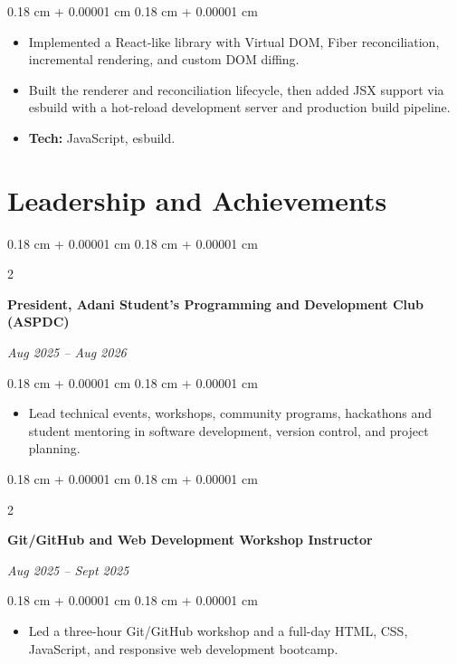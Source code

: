 \documentclass[10pt, letterpaper]{article}
\newenvironment{highlights}{
    \begin{itemize}[
        topsep=0.09 cm,
        parsep=0.09 cm,
        partopsep=0pt,
        itemsep=0pt,
        leftmargin=0.4 cm + 10pt
    ]
}{
    \end{itemize}
} %
\newenvironment{onecolentry}{
    \begin{adjustwidth}{
        0.18 cm + 0.00001 cm
    }{
        0.18 cm + 0.00001 cm
    }
}{
    \end{adjustwidth}
} %
\newenvironment{twocolentry}[2][]{
    \onecolentry
    \def\secondColumn{#2}
    \setcolumnwidth{\fill, 4.5 cm}
    \begin{paracol}{2}
}{
    \switchcolumn \raggedleft \secondColumn
    \end{paracol}
    \endonecolentry
} %
\begin{document}
\vspace{0.02 cm}
\begin{onecolentry}
    \begin{highlights}
        \item Implemented a React-like library with Virtual DOM, Fiber reconciliation, incremental rendering, and custom DOM diffing.
        \item Built the renderer and reconciliation lifecycle, then added JSX support via esbuild with a hot-reload development server and production build pipeline.
        \item \textbf{Tech:} JavaScript, esbuild.
    \end{highlights}
\end{onecolentry}

\vspace{0.05 cm}

    
\section{Leadership and Achievements}

\begin{twocolentry}{
\textit{Aug 2025 – Aug 2026}}
\textbf{President, Adani Student's Programming and Development Club (ASPDC)}
\end{twocolentry}

\vspace{0.02 cm}
\begin{onecolentry}
    \begin{highlights}
        \item Lead technical events, workshops, community programs, hackathons and student mentoring in software development, version control, and project planning.
    \end{highlights}
\end{onecolentry}

\vspace{0.05 cm}

\begin{twocolentry}{
\textit{Aug 2025 -- Sept 2025}}
\textbf{Git/GitHub and Web Development Workshop Instructor}
\end{twocolentry}

\vspace{0.02 cm}
\begin{onecolentry}
    \begin{highlights}
        \item Led a three-hour Git/GitHub workshop and a full-day HTML, CSS, JavaScript, and responsive web development bootcamp.
    \end{highlights}
\end{onecolentry}
\end{document}
